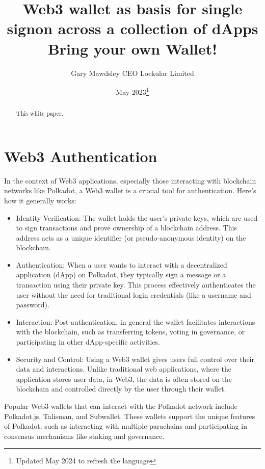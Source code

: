 \documentclass{tufte-handout}
\title{Web3 wallet as basis for single signon across a collection of dApps \\
\large Bring your own Wallet!}
\author[Gary Mawdsley]{Gary Mawdsley CEO Lockular Limited}
\date{May 2023\thanks{Updated May 2024 to refresh the language}}  %
\begin{document}
\maketitle%

\begin{abstract}
\noindent This white paper.

\end{abstract}


\section{Web3 Authentication}\label{sec:page-layout}

In the context of Web3 applications, especially those interacting with blockchain networks like Polkadot, a Web3 wallet is a crucial tool for authentication.
Here's how it generally works:
\begin{itemize}
    \item Identity Verification: The wallet holds the user's private keys, which are used to sign transactions and prove ownership of a blockchain address. This address
    acts as a unique identifier (or pseudo-anonymous identity) on the blockchain.
    \item Authentication: When a user wants to interact with a decentralized application (dApp) on Polkadot, they typically sign a message or a transaction using their
    private key. This process effectively authenticates the user without the need for traditional login credentials (like a username and password).
    \item Interaction: Post-authentication, in general the wallet facilitates interactions with the blockchain, such as transferring tokens, voting in governance, or participating
    in other dApp-specific activities.
    \item Security and Control: Using a Web3 wallet gives users full control over their data and interactions. Unlike traditional web applications, where the application
    stores user data, in Web3, the data is often stored on the blockchain and controlled directly by the user through their wallet.
 \end{itemize}

 Popular Web3 wallets that can interact with the Polkadot network include Polkadot.js, Talisman, and Subwallet. These wallets support the unique features of Polkadot, such as
 interacting with multiple parachains and participating in consensus mechanisms like staking and governance.
\end{document}
